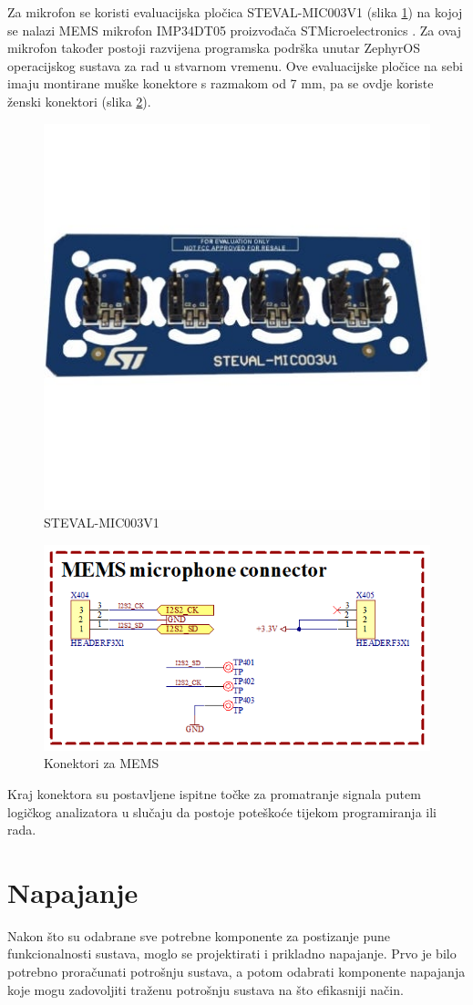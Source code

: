 Za mikrofon se koristi evaluacijska pločica STEVAL-MIC003V1 (slika \ref{slk:STEVAL}) na kojoj se nalazi MEMS mikrofon IMP34DT05 proizvođača STMicroelectronics \cite{stmicroelectronics:steval}. Za ovaj mikrofon također postoji razvijena programska podrška unutar ZephyrOS operacijskog sustava za rad u stvarnom vremenu. Ove evaluacijske pločice na sebi imaju montirane muške konektore s razmakom od 7 mm, pa se ovdje koriste ženski konektori (slika \ref{slk:MEMS}).
\begin{figure}[h!bt]
    \centering
    \includegraphics[width=6 cm]{Figures/STEVAL.jpg}
    \caption{STEVAL-MIC003V1}
    \label{slk:STEVAL}
\end{figure}
\begin{figure}[h!bt]
    \centering
    \includegraphics[width=6 cm]{Figures/MEMS.png}
    \caption{Konektori za MEMS}
    \label{slk:MEMS}
\end{figure}
Kraj konektora su postavljene ispitne točke za promatranje signala putem logičkog analizatora u slučaju da postoje poteškoće tijekom programiranja ili rada.

\section{Napajanje}
Nakon što su odabrane sve potrebne komponente za postizanje pune funkcionalnosti sustava, moglo se projektirati i prikladno napajanje. Prvo je bilo potrebno proračunati potrošnju sustava, a potom odabrati komponente napajanja koje mogu zadovoljiti traženu potrošnju sustava na što efikasniji način.

